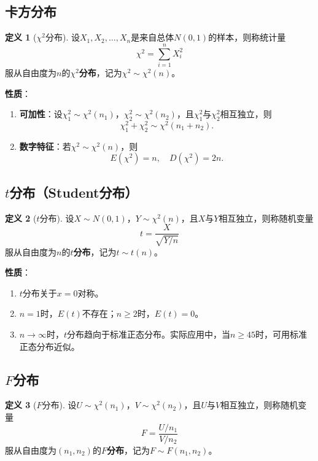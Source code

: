 \documentclass[11pt,a4paper]{report}
\theoremstyle{definition}
\newtheorem{definition}{定义}[chapter]
\theoremstyle{plain}
\begin{document}
\subsection{卡方分布}

\begin{definition}[$\chi^2$分布]
设$X_1,X_2,\ldots,X_n$是来自总体$N(0,1)$的样本，则称统计量
\[
\chi^2=\sum_{i=1}^{n}X_i^2
\]
服从自由度为$n$的\textbf{$\chi^2$分布}，记为$\chi^2\sim\chi^2(n)$。
\end{definition}

\textbf{性质}：
\begin{enumerate}[label=\arabic*.,leftmargin=2em]
    \item \textbf{可加性}：设$\chi_1^2\sim\chi^2(n_1)$，$\chi_2^2\sim\chi^2(n_2)$，且$\chi_1^2$与$\chi_2^2$相互独立，则
    \[
    \chi_1^2+\chi_2^2\sim\chi^2(n_1+n_2).
    \]
    \item \textbf{数字特征}：若$\chi^2\sim\chi^2(n)$，则
    \[
    E(\chi^2)=n,\quad D(\chi^2)=2n.
    \]
\end{enumerate}

\subsection{\texorpdfstring{$t$}{t}分布（Student分布）}

\begin{definition}[$t$分布]
设$X\sim N(0,1)$，$Y\sim\chi^2(n)$，且$X$与$Y$相互独立，则称随机变量
\[
t=\frac{X}{\sqrt{Y/n}}
\]
服从自由度为$n$的\textbf{$t$分布}，记为$t\sim t(n)$。
\end{definition}

\textbf{性质}：
\begin{enumerate}[label=\arabic*.,leftmargin=2em]
    \item $t$分布关于$x=0$对称。
    \item $n=1$时，$E(t)$不存在；$n\geq 2$时，$E(t)=0$。
    \item $n\to\infty$时，$t$分布趋向于标准正态分布。实际应用中，当$n\geq 45$时，可用标准正态分布近似。
\end{enumerate}

\subsection{\texorpdfstring{$F$}{F}分布}

\begin{definition}[$F$分布]
设$U\sim\chi^2(n_1)$，$V\sim\chi^2(n_2)$，且$U$与$V$相互独立，则称随机变量
\[
F=\frac{U/n_1}{V/n_2}
\]
服从自由度为$(n_1,n_2)$的\textbf{$F$分布}，记为$F\sim F(n_1,n_2)$。
\end{definition}
\end{document}
